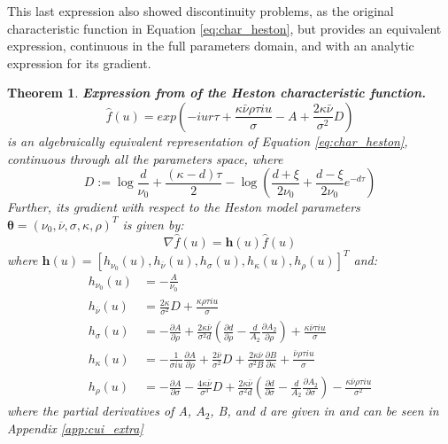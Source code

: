 \documentclass[12,twoside]{mammeTFM}
\newtheorem{thm}{Theorem}[section]
\theoremstyle{definition}
\theoremstyle{remark}
\begin{document}
This last expression also showed discontinuity problems, as the original characteristic function in Equation \ref{eq:char_heston}, but \cite{cui17} provides an equivalent expression, continuous in the full parameters domain, and with an analytic expression for its gradient.

\begin{thm}\label{theorem:cui} \textbf{Expression from \cite{cui17} of the Heston characteristic function.}
\begin{equation} \label{eq:char_cui}
\hat{f}(u) = exp \left(-i u r \tau + \dfrac{\kappa \bar{\nu} \rho \tau i u}{\sigma}-A + \dfrac{2 \kappa \bar{\nu}}{\sigma^{2}}D \right)
\end{equation}
is an algebraically equivalent representation of Equation \ref{eq:char_heston}, continuous through all the parameters space, where
\begin{equation}
D := \log \frac{d}{\nu_{0}}+\frac{(\kappa-d) \tau}{2}-\log \left(\frac{d+\xi}{2 \nu_{0}}+\frac{d-\xi}{2 \nu_{0}} e^{-d \tau}\right)
\end{equation}
Further, its gradient with respect to the Heston model parameters $\boldsymbol{\theta} = (\nu_0, \overline{\nu}, \sigma, \kappa, \rho)^{T}$ is given by:
\begin{equation}
\nabla \hat{f}(u) = \boldsymbol{h}(u) \hat{f}(u)
\end{equation}
where $\boldsymbol{h}(u) = [h_{\nu_0}(u), h_{\overline{\nu}}(u), h_\sigma(u), h_\kappa(u), h_\rho(u)]^T$ and:
\begin{align}
h_{\nu_0}(u)& =-\frac{A}{\nu_{0}} \\
h_{\overline{\nu}}(u)& =\frac{2 \kappa}{\sigma^{2}} D+\frac{\kappa \rho \tau i u}{\sigma} \\
h_{\sigma}(u)& =-\frac{\partial A}{\partial \rho}+\frac{2 \kappa \bar{\nu}}{\sigma^{2} d}\left(\frac{\partial d}{\partial \rho}-\frac{d}{A_{2}} \frac{\partial A_{2}}{\partial \rho}\right)+\frac{\kappa \bar{\nu} \tau i u}{\sigma} \\
h_{\kappa}(u)& =-\frac{1}{\sigma i u} \frac{\partial A}{\partial \rho}+\frac{2 \bar{\nu}}{\sigma^{2}} D+\frac{2 \kappa \bar{\nu}}{\sigma^{2} B} \frac{\partial B}{\partial \kappa}+\frac{\bar{\nu} \rho \tau i u}{\sigma} \\
h_{\rho}(u)& =-\frac{\partial A}{\partial \sigma}-\frac{4 \kappa \bar{\nu}}{\sigma^{3}} D+\frac{2 \kappa \bar{\nu}}{\sigma^{2} d}\left(\frac{\partial d}{\partial \sigma}-\frac{d}{A_{2}} \frac{\partial A_{2}}{\partial \sigma}\right)-\frac{\kappa \bar{\nu} \rho \tau i u}{\sigma^{2}}
\end{align}
where the partial derivatives of A, $A_2$, B, and d are given in \cite{cui17} and can be seen in Appendix \ref{app:cui_extra}
\end{thm}
\end{document}

